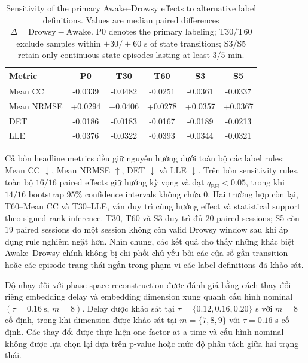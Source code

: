 \begin{table}[t]
\centering
\caption{Sensitivity of the primary Awake--Drowsy effects to alternative label definitions. Values are median paired differences $\Delta=\mathrm{Drowsy}-\mathrm{Awake}$. P0 denotes the primary labeling; T30/T60 exclude samples within $\pm30/\pm60$ s of state transitions; S3/S5 retain only continuous state episodes lasting at least $3/5$ min.}
\label{tab:label_sensitivity}
\footnotesize
\setlength{\tabcolsep}{4.5pt}
\renewcommand{\arraystretch}{1.08}
\begin{tabular}{lccccc}
\toprule
\textbf{Metric} & \textbf{P0} & \textbf{T30} & \textbf{T60} & \textbf{S3} & \textbf{S5} \\
\midrule
Mean CC
& -0.0339 & -0.0482 & -0.0251 & -0.0361 & -0.0337 \\
Mean NRMSE
& +0.0294 & +0.0406 & +0.0278 & +0.0357 & +0.0367 \\
DET
& -0.0186 & -0.0183 & -0.0167 & -0.0189 & -0.0213 \\
LLE
& -0.0376 & -0.0322 & -0.0393 & -0.0344 & -0.0321 \\
\bottomrule
\end{tabular}
\end{table}

Cả bốn headline metrics đều giữ nguyên hướng dưới toàn bộ các label rules: Mean CC $\downarrow$, Mean NRMSE $\uparrow$, DET $\downarrow$ và LLE $\downarrow$. Trên bốn sensitivity rules, toàn bộ $16/16$ paired effects giữ hướng kỳ vọng và đạt $q_{\mathrm{BH}}<0.05$, trong khi $14/16$ bootstrap 95\% confidence intervals không chứa 0. Hai trường hợp còn lại, T60--Mean CC và T30--LLE, vẫn duy trì cùng hướng effect và statistical support theo signed-rank inference. T30, T60 và S3 duy trì đủ $20$ paired sessions; S5 còn $19$ paired sessions do một session không còn valid Drowsy window sau khi áp dụng rule nghiêm ngặt hơn. Nhìn chung, các kết quả cho thấy những khác biệt Awake--Drowsy chính không bị chi phối chủ yếu bởi các cửa sổ gần transition hoặc các episode trạng thái ngắn trong phạm vi các label definitions đã khảo sát.

Độ nhạy đối với phase-space reconstruction được đánh giá bằng cách thay đổi riêng embedding delay và embedding dimension xung quanh cấu hình nominal $(\tau=0.16~\mathrm{s},\,m=8)$. Delay được khảo sát tại $\tau=\{0.12,0.16,0.20\}$ s với $m=8$ cố định, trong khi dimension được khảo sát tại $m=\{7,8,9\}$ với $\tau=0.16$ s cố định. Các thay đổi được thực hiện one-factor-at-a-time và cấu hình nominal không được lựa chọn lại dựa trên p-value hoặc mức độ phân tách giữa hai trạng thái.

